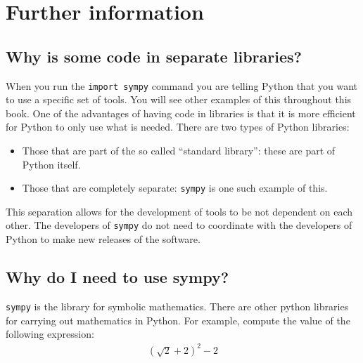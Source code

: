 \begin{pyin}
\begin{enumerate}
\begin{enumerate}
\end{enumerate}

\end{enumerate}

\section{Further information}
\label{\detokenize{tools-for-mathematics/02-algebra/why/main:further-information}}\label{\detokenize{tools-for-mathematics/02-algebra/why/main::doc}}

\subsection{Why is some code in separate libraries?}
\label{\detokenize{tools-for-mathematics/02-algebra/why/main:why-is-some-code-in-separate-libraries}}

When you run the \texttt{import sympy} command you are telling Python that you want to use
a specific set of tools. You will see other examples of this throughout this
book.
One of the advantages of having code in libraries is that it is more efficient
for Python to only use what is needed.
There are two types of Python libraries:
\begin{itemize}
\item 

Those that are part of the so called “standard library”: these are part of
Python itself.

\item 

Those that are completely separate: \texttt{sympy} is one such example of this.

\end{itemize}


This separation allows for the development of tools to be not dependent on each
other. The developers of \texttt{sympy} do not need to coordinate with the developers
of Python to make new releases of the software.


\subsection{Why do I need to use sympy?}
\label{\detokenize{tools-for-mathematics/02-algebra/why/main:why-do-we-need-to-use-sympy}}

\texttt{sympy} is the library for symbolic mathematics. There are other python libraries
for carrying out mathematics in Python.
For example, compute the value of the following expression:
\begin{equation*}
\begin{split}
    (\sqrt{2} + 2) ^ 2 - 2
\end{split}
\end{equation*}


\end{pyin}
